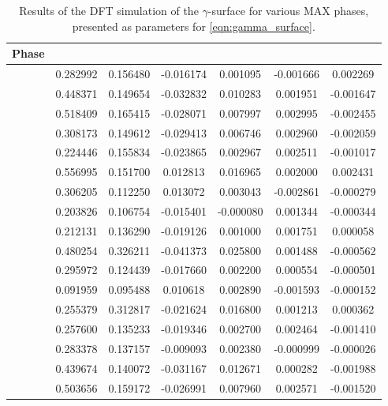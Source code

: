 \begin{table}
\footnotesize
\centering
\begin{tabular}{|l|S|S|S|S|S|S|}
\hline
   Phase\rule[3ex]{0pt}{0pt} &         &         &         &         &         &         \\
\hline
   \rule[3ex]{0pt}{0pt}   &  0.282992 &  0.156480 & -0.016174 &  0.001095 & -0.001666 &  0.002269 \\
                         &  0.448371 &  0.149654 & -0.032832 &  0.010283 &  0.001951 & -0.001647 \\
                        &  0.518409 &  0.165415 & -0.028071 &  0.007997 &  0.002995 & -0.002455 \\
                         &  0.308173 &  0.149612 & -0.029413 &  0.006746 &  0.002960 & -0.002059 \\
                         &  0.224446 &  0.155834 & -0.023865 &  0.002967 &  0.002511 & -0.001017 \\
                          &  0.556995 &  0.151700 &  0.012813 &  0.016965 &  0.002000 &  0.002431 \\
                         &  0.306205 &  0.112250 &  0.013072 &  0.003043 & -0.002861 & -0.000279 \\
                         &  0.203826 &  0.106754 & -0.015401 & -0.000080 &  0.001344 & -0.000344 \\
                         &  0.212131 &  0.136290 & -0.019126 &  0.001000 &  0.001751 &  0.000058 \\
                          &  0.480254 &  0.326211 & -0.041373 &  0.025800 &  0.001488 & -0.000562 \\
                         &  0.295972 &  0.124439 & -0.017660 &  0.002200 &  0.000554 & -0.000501 \\
                         &  0.091959 &  0.095488 &  0.010618 &  0.002890 & -0.001593 & -0.000152 \\
                          &  0.255379 &  0.312817 & -0.021624 &  0.016800 &  0.001213 &  0.000362 \\
                         &  0.257600 &  0.135233 & -0.019346 &  0.002700 &  0.002464 & -0.001410 \\
                        &  0.283378 &  0.137157 & -0.009093 &  0.002380 & -0.000999 & -0.000026 \\
                        &  0.439674 &  0.140072 & -0.031167 &  0.012671 &  0.000282 & -0.001988 \\
  \rule[-1ex]{0pt}{0pt} &  0.503656 &  0.159172 & -0.026991 &  0.007960 &  0.002571 & -0.001520 \\
\hline
\end{tabular}
\captionsetup{width=1.2\textwidth}
\caption[\texorpdfstring{$\gamma$}{gamma}-surface results]{Results of the DFT simulation of the $\gamma$-surface for various MAX phases, presented as parameters for \autoref{eqn:gamma_surface}. \label{tab:gamma_surface_params}}
\end{table}


